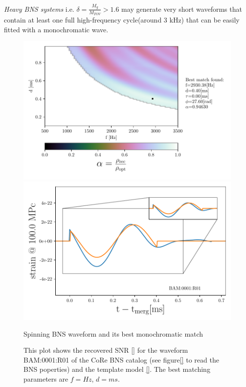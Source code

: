 \FloatBarrier



\textit{Heavy BNS systems} i.e. $\delta=\frac{M_g}{M_{TOV}}>1.6$ may generate very short waveforms that contain at least one full high-frequency cycle(around 3 kHz) that can be easily fitted with a monochromatic wave.

\begin{figure}[!htbp]
\begin{center}
\begin{minipage}[t]{0.5\linewidth}
\vspace{0pt}
\includegraphics[scale=0.6,trim={2mm 0 35mm 0},clip]{images/Data_analysis/results/2D_grid_7.pdf}
\end{minipage}%
\begin{minipage}[t]{0.5\linewidth}
\vspace{20pt}
\includegraphics[scale=0.45]{images/Data_analysis/results/2D_grid_8.pdf}
\end{minipage}
\captionsetup{width=0.8\textwidth}
\caption{Spinning BNS waveform and its best monochromatic match}
\caption*{This plot shows the recovered SNR \ref{} for the waveform BAM:0001:R01 of the CoRe BNS catalog \cite{}(see figure\ref{} to read the BNS poperties) and the template model \ref{}. The best matching parameters are $f=Hz$, $d=ms$.}
\end{center}
\end{figure}

